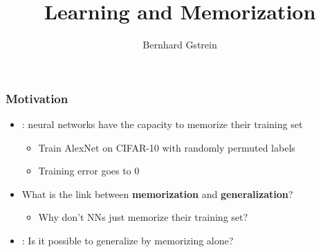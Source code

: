 \documentclass[pdflatex,compress]{beamer}
\title{Learning and Memorization}
\author{Bernhard Gstrein}
\begin{document}
\maketitle

\AtBeginSection[]{}

\begin{frame}
\frametitle{Motivation}
\begin{itemize}
	\item \parencite{zhang2017understanding}: neural networks have the capacity to memorize their training set 
		\begin{itemize}
			\item Train AlexNet on CIFAR-10 with randomly permuted labels
			\item Training error goes to 0
		\end{itemize}
		\vspace{1em}
	\item What is the link between \textbf{memorization} and \textbf{generalization}?
		\begin{itemize}
		\item Why don't NNs just memorize their training set?
		\end{itemize}
		\vspace{1em}
	\item \parencite{chatterjee2018learning}: Is it possible to generalize by memorizing alone?
\end{itemize}
\end{frame}
\end{document}
